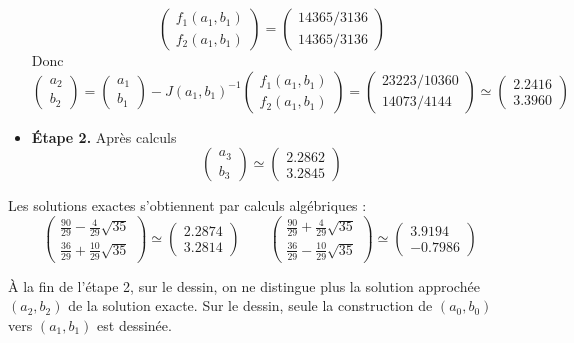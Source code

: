 \documentclass[class=report,crop=false]{standalone}
\begin{document}
\begin{exemple}
\begin{itemize}
$$  \begin{pmatrix}f_1(a_1,b_1)\\f_2(a_1,b_1)\end{pmatrix}
  =\begin{pmatrix}14365/3136\\14365/3136\end{pmatrix}$$
  Donc
  $$\begin{pmatrix}a_{2}\\b_{2}\end{pmatrix} = \begin{pmatrix}a_1\\b_1\end{pmatrix}-J(a_1,b_1)^{-1}\begin{pmatrix}f_1(a_1,b_1)\\f_2(a_1,b_1)\end{pmatrix}
  = \begin{pmatrix}23223/10360\\14073/4144\end{pmatrix}
  \simeq \begin{pmatrix} \num{2.2416}\\\num{3.3960}\end{pmatrix}$$
  \item \textbf{\'Etape 2.} Après calculs
  $$\begin{pmatrix}a_{3}\\b_{3}\end{pmatrix} \simeq \begin{pmatrix} \num{2.2862}\\\num{3.2845}\end{pmatrix}$$
\end{itemize}
Les solutions exactes s'obtiennent par calculs algébriques :
$$\begin{pmatrix}\frac{90}{29}-\frac{4}{29}\sqrt{35}\\ \frac{36}{29}+\frac{10}{29} \sqrt{35} \end{pmatrix} \simeq \begin{pmatrix}\num{2.2874} \\ \num{3.2814}\end{pmatrix} \qquad
\begin{pmatrix}\frac{90}{29}+\frac{4}{29}\sqrt{35}\\ \frac{36}{29}-\frac{10}{29} \sqrt{35} \end{pmatrix} \simeq \begin{pmatrix}\num{3.9194} \\ \num{-0.7986}\end{pmatrix}$$

\`A la fin de l'étape 2, sur le dessin, on ne distingue plus 
la solution approchée $(a_2,b_2)$ de la solution exacte.
Sur le dessin, seule la construction de $(a_0,b_0)$ vers $(a_1,b_1)$ est dessinée. 
  
\end{exemple}
\end{document}
